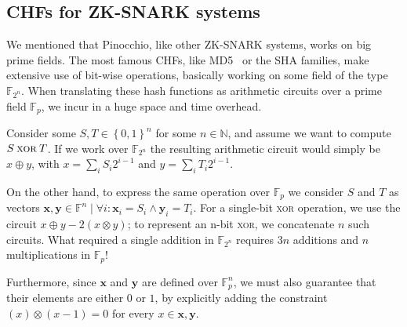 \subsection{CHFs for ZK-SNARK systems}
We mentioned that Pinocchio, like other ZK-SNARK systems, works on big prime fields.
The most famous CHFs, like MD5~\cite{Rivest1990} or the SHA families, make extensive use of
bit-wise operations, basically working on some field of the type \(\mathbb{F}_{2^n}\).
When translating these hash functions as arithmetic circuits over a prime field \(\mathbb{F}_p\),
we incur in a huge space and time overhead.
\begin{example}
	Consider some \(S, T \in {\left\{0, 1\right\}}^n\) for some \(n \in \mathbb{N}\), and assume we
	want to compute \(S \mathbin{\textsc{xor}} T\).
	If we work over \(\mathbb{F}_{2^n}\) the resulting arithmetic circuit would simply be
	\(x \oplus y\), with \(x = \sum_{i}{S_{i}2^{i-1}}\) and \(y = \sum_{i}{T_{i}2^{i-1}}\).

	On the other hand, to express the same operation over \(\mathbb{F}_p\) we consider \(S\) and
	\(T\) as vectors
	\(\bm{x}, \bm{y} \in \mathbb{F}^n \mid \forall i\colon \bm{x}_i = S_i \wedge \bm{y}_i = T_i\).
	For a single-bit \textsc{xor} operation, we use the circuit
	\(x \oplus y - 2\left(x \otimes y\right) \); to represent an n-bit \textsc{xor}, we concatenate
	\(n\) such circuits.
	What required a single addition in \(\mathbb{F}_{2^n}\) requires \(3n\) additions and \(n\)
	multiplications in \(\mathbb{F}_p\)!

	Furthermore, since \(\bm{x}\) and \(\bm{y}\) are defined over \(\mathbb{F}_p^n\), we must also
	guarantee that their elements are either \(0\) or \(1\), by explicitly adding the constraint
	\(\left(x\right) \otimes \left(x - 1\right) = 0\) for every \(x \in \bm{x}, \bm{y}\).
\end{example}

